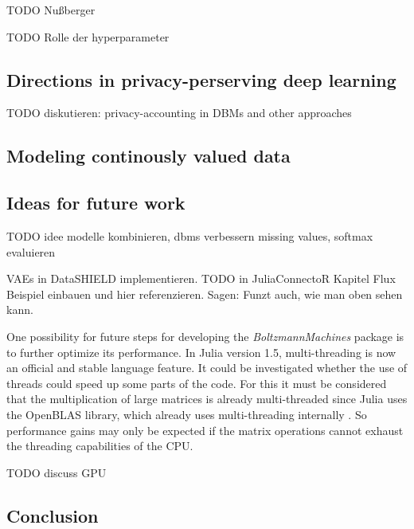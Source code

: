 \documentclass[12pt]{article}
\newcommand{\apkg}[1]{\emph{#1}}
\begin{document}
TODO Nußberger

TODO Rolle der hyperparameter

\subsection{Directions in privacy-perserving deep learning}
TODO diskutieren: privacy-accounting in DBMs and other approaches

\subsection{Modeling continously valued data}

\subsection{Ideas for future work}
TODO idee modelle kombinieren, dbms verbessern missing values, softmax evaluieren

VAEs in DataSHIELD implementieren. TODO in JuliaConnectoR Kapitel Flux Beispiel einbauen und hier referenzieren. Sagen: Funzt auch, wie man oben sehen kann.

One possibility for future steps for developing the \apkg{BoltzmannMachines} package is to further optimize its performance.
In Julia version 1.5, multi-threading is now an official and stable language feature.
It could be investigated whether the use of threads could speed up some parts of the code.
For this it must be considered that the multiplication of large matrices is already multi-threaded since Julia uses the OpenBLAS library, which already uses multi-threading internally \citep{openblas}.
So performance gains may only be expected if the matrix operations cannot exhaust the threading capabilities of the CPU.

TODO discuss GPU




\subsection{Conclusion}

\clearpage
\appendix
\end{document}
